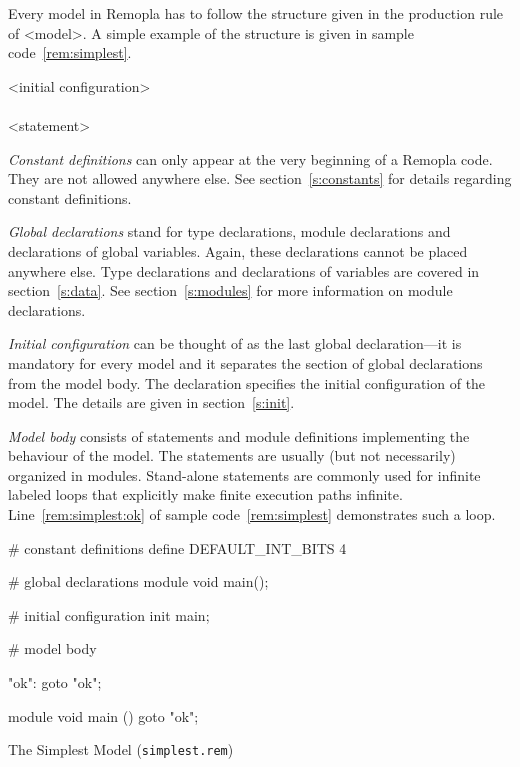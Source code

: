 \documentclass[a4paper,11pt,titlepage,english]{article}
\begin{document}
Every model in Remopla has to follow the structure given in the production
rule of <model>. A simple example of the structure is given in sample
code~\ref{rem:simplest}.

\begin{bnfgrammar}
[model] \is {}
            <initial configuration>
            \\
[global declaration]  
    \\
[module or statement] \is <statement> \\
\end{bnfgrammar}

\emph{Constant definitions\/} can only appear at the very beginning of
a Remopla code. They are not allowed anywhere else.  See
section~\ref{s:constants} for details regarding constant definitions.

\emph{Global declarations\/} stand for type declarations, module
declarations and declarations of global variables. Again, these
declarations cannot be placed anywhere else. Type declarations and
declarations of variables are covered in section~\ref{s:data}. See
section~\ref{s:modules} for more information on module declarations.

\emph{Initial configuration\/} can be thought of as the last global
declaration---it is mandatory for every model and it separates the section
of global declarations from the model body.  The declaration specifies the
initial configuration of the model. The details are given in
section~\ref{s:init}.

\emph{Model body\/} consists of statements and module definitions
implementing the behaviour of the model. The statements are usually
(but not necessarily) organized in modules. Stand-alone statements are
commonly used for infinite labeled loops that explicitly make finite
execution paths infinite. Line~\ref{rem:simplest:ok} of sample
code~\ref{rem:simplest} demonstrates such a loop.

\begin{SampleCode}
\begin{RemoplaCode}
    # constant definitions
    define DEFAULT_INT_BITS 4

    # global declarations
    module void main();

    # initial configuration
    init main;

    # model body

    "ok": goto "ok";\label{rem:simplest:ok}

    module void main () {
        goto "ok";
    }
\end{RemoplaCode}
\caption{The Simplest Model (\texttt{simplest.rem})\label{rem:simplest}}
\end{SampleCode}
\end{document}
